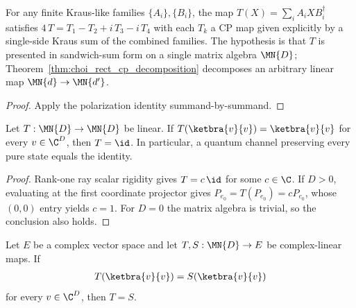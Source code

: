 \begin{theorem}
    \label{thm:cp_decomposition_of_sandwich_sum}
    \leanok
    For any finite Kraus-like families $\{A_i\}, \{B_i\}$, the map
    $T(X) = \sum_i A_i X B_i^\dagger$ satisfies
    $4\,T = T_1 - T_2 + i\,T_3 - i\,T_4$ with each $T_k$ a CP map given
    explicitly by a single-side Kraus sum of the combined families. The
    hypothesis is that $T$ is presented in sandwich-sum form on a single
    matrix algebra $\MN{D}$; Theorem~\ref{thm:choi_rect_cp_decomposition}
    decomposes an arbitrary linear map $\MN{d}\to\MN{d'}$.
\end{theorem}

\begin{proof}
    \leanok
    Apply the polarization identity summand-by-summand.
\end{proof}

\begin{theorem}
    \label{thm:linearMap_eq_id_of_fixes_rankOne}
    \leanok
    Let $T : \MN{D} \to \MN{D}$ be linear. If $T(\ketbra{v}{v})
        = \ketbra{v}{v}$ for every $v \in \C^D$, then
    $T = \id$. In particular, a quantum channel preserving every
    pure state equals the identity.
\end{theorem}

\begin{proof}
    \leanok
    Rank-one ray scalar rigidity gives $T=c\,\id$ for some $c\in\C$.
    If $D>0$, evaluating at the first coordinate projector gives
    $P_{e_0}=T(P_{e_0})=cP_{e_0}$, whose $(0,0)$ entry yields $c=1$.
    For $D=0$ the matrix algebra is trivial, so the conclusion also holds.
\end{proof}

\begin{theorem}
    \label{thm:linearMap_eq_of_eq_on_rankOne}
    \leanok
    Let $E$ be a complex vector space and let
    $T,S:\MN{D}\to E$ be complex-linear maps. If
    \begin{align}
        T(\ketbra{v}{v})=S(\ketbra{v}{v})
    \end{align}
    for every $v\in\C^D$, then $T=S$.
\end{theorem}

